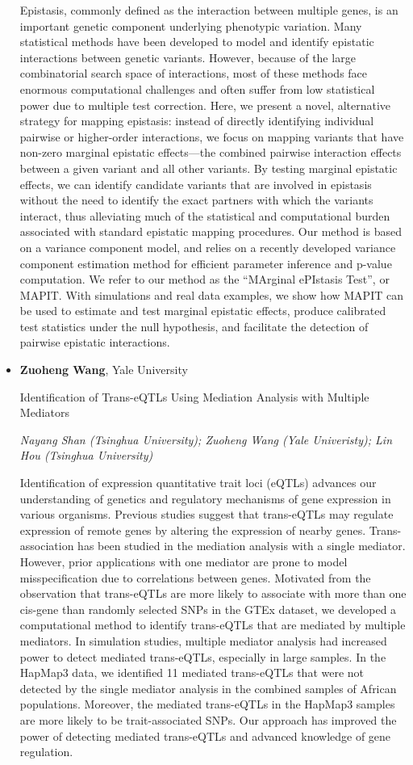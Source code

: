 \begin{itemize}
Epistasis, commonly defined as the interaction between multiple genes, is an important genetic component underlying phenotypic variation. Many statistical methods have been developed to model and identify epistatic interactions between genetic variants. However, because of the large combinatorial search space of interactions, most of these methods face enormous computational challenges and often suffer from low statistical power due to multiple test correction. Here, we present a novel, alternative strategy for mapping epistasis: instead of directly identifying individual pairwise or higher-order interactions, we focus on mapping variants that have non-zero marginal epistatic effects—the combined pairwise interaction effects between a given variant and all other variants. By testing marginal epistatic effects, we can identify candidate variants that are involved in epistasis without the need to identify the exact partners with which the variants interact, thus alleviating much of the statistical and computational burden associated with standard epistatic mapping procedures. Our method is based on a variance component model, and relies on a recently developed variance component estimation method for efficient parameter inference and p-value computation. We refer to our method as the “MArginal ePIstasis Test”, or MAPIT. With simulations and real data examples, we show how MAPIT can be used to estimate and test marginal epistatic effects, produce calibrated test statistics under the null hypothesis, and facilitate the detection of pairwise epistatic interactions.

\item \textbf{Zuoheng Wang}, Yale University

Identification of Trans-eQTLs Using Mediation Analysis with Multiple Mediators

\emph{\footnotesize Nayang Shan (Tsinghua University); Zuoheng Wang (Yale Univeristy); Lin Hou (Tsinghua University)}

Identification of expression quantitative trait loci (eQTLs) advances our understanding of genetics and regulatory mechanisms of gene expression in various organisms. Previous studies suggest that trans-eQTLs may regulate expression of remote genes by altering the expression of nearby genes. Trans-association has been studied in the mediation analysis with a single mediator. However, prior applications with one mediator are prone to model misspecification due to correlations between genes. Motivated from the observation that trans-eQTLs are more likely to associate with more than one cis-gene than randomly selected SNPs in the GTEx dataset, we developed a computational method to identify trans-eQTLs that are mediated by multiple mediators. In simulation studies, multiple mediator analysis had increased power to detect mediated trans-eQTLs, especially in large samples. In the HapMap3 data, we identified 11 mediated trans-eQTLs that were not detected by the single mediator analysis in the combined samples of African populations. Moreover, the mediated trans-eQTLs in the HapMap3 samples are more likely to be trait-associated SNPs. Our approach has improved the power of detecting mediated trans-eQTLs and advanced knowledge of gene regulation.


\end{itemize}
